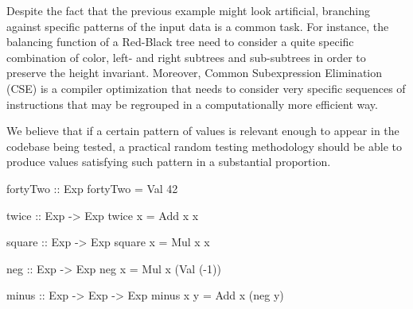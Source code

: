 Despite the fact that the previous example might look artificial, branching
against specific patterns of the input data is a common task.
%
For instance, the balancing function of a Red-Black tree need to consider a
quite specific combination of color, left- and right subtrees and sub-subtrees
in order to preserve the height invariant.
%
Moreover, Common Subexpression Elimination (CSE) is a compiler optimization that
needs to consider very specific sequences of instructions that may be regrouped
in a computationally more efficient way.

We believe that if a certain pattern of values is relevant enough to appear in
the codebase being tested, a practical random testing methodology should be able
to produce values satisfying such pattern in a substantial proportion.


\begin{code}
fortyTwo :: Exp
fortyTwo = Val 42

twice :: Exp -> Exp
twice x = Add x x

square :: Exp -> Exp
square x = Mul x x

neg :: Exp -> Exp
neg x = Mul x (Val (-1))

minus :: Exp -> Exp -> Exp
minus x y = Add x (neg y)
\end{code}








